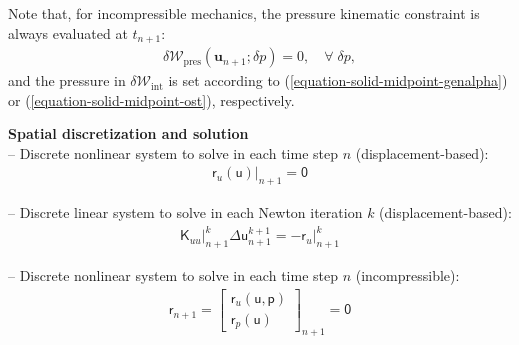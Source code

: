 \documentclass[a4paper,12pt]{report}
\newcommand{\bs}[1]{\boldsymbol{#1}}
\newcommand{\ROP}{\bs{\mathsf{r}}}
\begin{document}
Note that, for incompressible mechanics, the pressure kinematic constraint is always evaluated at $t_{n+1}$:
\begin{equation}
\begin{aligned}
\delta \mathcal{W}_{\mathrm{pres}}(\bs{u}_{n+1};\delta p) = 0, \quad \forall \; \delta p,
\end{aligned}
\end{equation}
and the pressure in $\delta \mathcal{W}_{\mathrm{int}}$ is set according to (\ref{equation-solid-midpoint-genalpha}) or (\ref{equation-solid-midpoint-ost}), respectively.

\textbf{Spatial discretization and solution}\\

-- Discrete nonlinear system to solve in each time step $n$ (displacement-based):
\begin{equation}
\label{equation-nonlin-sys-solid}
\begin{aligned}
\left.\ROP_{u}(\bs{\mathsf{u}})\right|_{n+1} = \bs{\mathsf{0}}
\end{aligned}
\end{equation}

-- Discrete linear system to solve in each Newton iteration $k$ (displacement-based):
\begin{equation}
\label{equation-lin-sys-solid}
\begin{aligned}
\left. \bs{\mathsf{K}}_{uu} \right|_{n+1}^{k} \Delta\bs{\mathsf{u}}_{n+1}^{k+1}=-\left. \ROP_{u} \right|_{n+1}^{k}
\end{aligned}
\end{equation}

-- Discrete nonlinear system to solve in each time step $n$ (incompressible):
\begin{equation}
\label{equation-nonlin-sys-solid-inc}
\begin{aligned}
\ROP_{n+1} = \begin{bmatrix} \ROP_{u}(\bs{\mathsf{u}},\bs{\mathsf{p}}) \\ \ROP_{p}(\bs{\mathsf{u}}) \end{bmatrix}_{n+1} = \bs{\mathsf{0}}
\end{aligned}
\end{equation}
\end{document}

